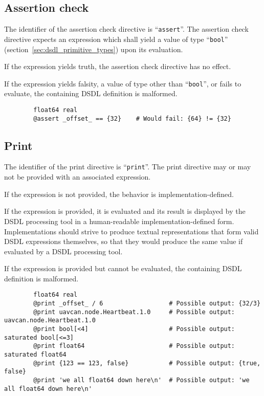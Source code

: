 \subsection{Assertion check}

The identifier of the assertion check directive is ``\verb|assert|''.
The assertion check directive expects an expression which shall yield a value of type
``\verb|bool|'' (section~\ref{sec:dsdl_primitive_types}) upon its evaluation.

If the expression yields truth, the assertion check directive has no effect.

If the expression yields falsity, a value of type other than ``\verb|bool|'', or fails to evaluate,
the containing DSDL definition is malformed.

\begin{remark}
    \begin{verbatim}
        float64 real
        @assert _offset_ == {32}    # Would fail: {64} != {32}
    \end{verbatim}
\end{remark}

\subsection{Print}

The identifier of the print directive is ``\verb|print|''.
The print directive may or may not be provided with an associated expression.

If the expression is not provided, the behavior is implementation-defined.

If the expression is provided, it is evaluated and its result is displayed by the DSDL processing tool in
a human-readable implementation-defined form.
Implementations should strive to produce textual representations that form valid DSDL expressions themselves,
so that they would produce the same value if evaluated by a DSDL processing tool.

If the expression is provided but cannot be evaluated, the containing DSDL definition is malformed.

\begin{remark}
    \begin{verbatim}
        float64 real
        @print _offset_ / 6                  # Possible output: {32/3}
        @print uavcan.node.Heartbeat.1.0     # Possible output: uavcan.node.Heartbeat.1.0
        @print bool[<4]                      # Possible output: saturated bool[<=3]
        @print float64                       # Possible output: saturated float64
        @print {123 == 123, false}           # Possible output: {true, false}
        @print 'we all float64 down here\n'  # Possible output: 'we all float64 down here\n'
    \end{verbatim}
\end{remark}
